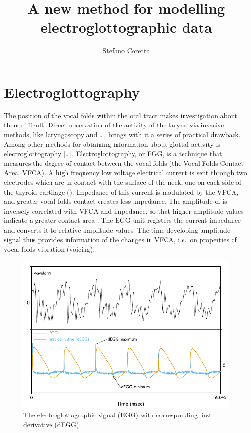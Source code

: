 \documentclass[12pt,a4paper,]{article}
\title{A new method for modelling electroglottographic data}
\author{Stefano Coretta}
\date{}
\begin{document}
\maketitle

\hypertarget{electroglottography}{%
\section{Electroglottography}\label{electroglottography}}

The position of the vocal folds within the oral tract makes
investigation about them difficult. Direct observation of the activity
of the larynx via invasive methods, like laryngoscopy and \ldots{},
brings with it a series of practical drawback. Among other methods for
obtaining information about glottal activity is electroglottography
{[}\ldots{}{]}. Electroglottography, or EGG, \citep{fabre1957} is a
technique that measures the degree of contact between the vocal folds
(the Vocal Folds Contact Area, VFCA). A high frequency low voltage
electrical current is sent through two electrodes which are in contact
with the surface of the neck, one on each side of the thyroid cartilage
(). Impedance of this current is modulated by the
VFCA, and greater vocal folds contact creates less impedance. The
amplitude of is inversely correlated with VFCA and impedance, so that
higher amplitude values indicate a greater contact area
\citep{titze1990}. The EGG unit registers the current impedance and
converts it to relative amplitude values. The time-developing amplitude
signal thus provides information of the changes in VFCA, i.e.~on
properties of vocal folds vibration (voicing).

\begin{figure}
  \includegraphics{./img/degg-signal.pdf}
  \caption{The electroglottographic signal (EGG) with corresponding first derivative (dEGG).}
  \label{f:egg}
\end{figure}
\end{document}
